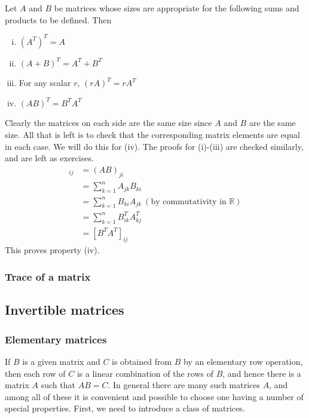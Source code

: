 \documentclass[12pt,letterpaper,reqno]{article}
\numberwithin{equation}{section}
\newcommand{\fixme}[1]{{\color{orange}{[#1]}}}
\begin{document}
\begin{thm}[Properties of $A^T$]
	Let $A$ and $B$ be matrices whose sizes are appropriate for the following sums and products to be defined. Then
\begin{enumerate}[(i)]
	\item $(A^T)^T=A$
	\item $(A+B)^T=A^T+B^T$
	\item For any scalar $r$, $(rA)^T=rA^T$
	\item $(AB)^T=B^TA^T$
\end{enumerate}
\end{thm}

\begin{pf}
Clearly the matrices on each side are the same size since $A$ and $B$ are the same size. All that is left is to check that the corresponding matrix elements are equal in each case. We will do this for (iv). The proofs for (i)-(iii) are checked similarly, and are left as exercises. 
\begin{align*}
	[(AB)^T]_{ij}&=(AB)_{ji} \\
	&=\sum_{k=1}^n A_{jk}B_{ki} \\
	&=\sum_{k=1}^n B_{ki}A_{jk} \ (\text{by commutativity in } \mathbb{R}) \\
	&=\sum_{k=1}^n B^T_{ik}A^T_{kj} \\
	&=[B^TA^T]_{ij}	
\end{align*}
This proves property (iv).
\end{pf}

\subsubsection{Trace of a matrix}
\fixme{Is this a good place for this?}


\subsection{Invertible matrices}
\subsubsection{Elementary matrices}
If $B$ is a given matrix and $C$ is obtained from $B$ by  an elementary row operation, then each row of $C$ is a linear combination of the rows of $B$, and hence there is a matrix $A$ such that $AB=C$. In general there are many such matrices $A$, and among all of these it is convenient and possible to choose one having a number of special properties. First, we need to introduce a class of matrices. \fixme{Give a better introduction here.} 
\end{document}
